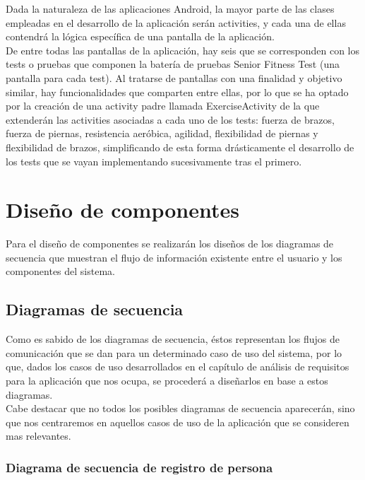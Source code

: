 Dada la naturaleza de las aplicaciones Android, la mayor parte de las clases empleadas en el desarrollo de la aplicación serán activities, y cada una de ellas contendrá la lógica específica de una pantalla de la aplicación.\\

De entre todas las pantallas de la aplicación, hay seis que se corresponden con los tests o pruebas que componen la batería de pruebas Senior Fitness Test (una pantalla para cada test). Al tratarse de pantallas con una finalidad y objetivo similar, hay funcionalidades que comparten entre ellas, por lo que se ha optado por la creación de una activity padre llamada ExerciseActivity de la que extenderán las activities asociadas a cada uno de los tests: fuerza de brazos, fuerza de piernas, resistencia aeróbica, agilidad, flexibilidad de piernas y flexibilidad de brazos, simplificando de esta forma drásticamente el desarrollo de los tests que se vayan implementando sucesivamente tras el primero.\\


\section{Diseño de componentes}

Para el diseño de componentes se realizarán los diseños de los diagramas de secuencia que muestran el flujo de información existente entre el usuario y los componentes del sistema.

\subsection{Diagramas de secuencia}

Como es sabido de los diagramas de secuencia, éstos representan los flujos de comunicación que se dan para un determinado caso de uso del sistema, por lo que, dados los casos de uso desarrollados en el capítulo de análisis de requisitos para la aplicación que nos ocupa, se procederá a diseñarlos en base a estos diagramas.\\

Cabe destacar que no todos los posibles diagramas de secuencia aparecerán, sino que nos centraremos en aquellos casos de uso de la aplicación que se consideren mas relevantes.

\subsubsection{Diagrama de secuencia de registro de persona}

